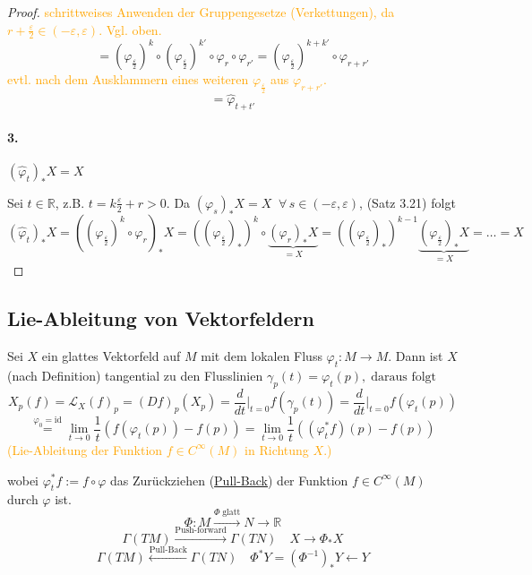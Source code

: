 \documentclass[fleqn, 12pt, letterpaper]{article}
\newcommand{\txt}[1]{\text{#1}}
\begin{document}
\begin{proof}
\hspace{2em} \textcolor{orange}{schrittweises Anwenden der Gruppengesetze (Verkettungen), da $r + \frac{\varepsilon}{2} \in (-\varepsilon, \varepsilon)$. Vgl. oben.}
\[
= \left(\varphi_{\frac{\varepsilon}{2}}\right)^k \circ \left(\varphi_{\frac{\varepsilon}{2}}\right)^{k'} \circ \varphi_r \circ \varphi_{r'}= \left(\varphi_{\frac{\varepsilon}{2}}\right)^{k + k'} \circ \varphi_{r + r'}
\]
\hspace{2em} \textcolor{orange}{evtl. nach dem Ausklammern eines weiteren $\varphi_{\frac{\varepsilon}{2}}$ aus $\varphi_{r+r'}$.}
\[= \hat{\varphi}_{t + t'}
\]
\paragraph{3.} $(\hat{\varphi}_t)_\ast X = X$

Sei $t \in \mathbb{R}$, z.B. $t = k \frac{\varepsilon}{2} + r > 0$. Da
\((\varphi_s)_\ast X = X \;\; \forall \, s \in (-\varepsilon, \varepsilon)\), (Satz 3.21)
folgt
\[
(\hat{\varphi}_t)_\ast X = \left((\varphi_{\frac{\varepsilon}{2}})^k \circ \varphi_r \right)_\ast X = \left((\varphi_{\frac{\varepsilon}{2}})_\ast\right)^k \circ \underbrace{(\varphi_r)_\ast X}_{= X} = \left((\varphi_{\frac{\varepsilon}{2}})_\ast\right)^{k-1} \underbrace{(\varphi_{\frac{\varepsilon}{2}})_\ast X}_{=X}=\dots=X
\]
\end{proof}


\subsection{Lie-Ableitung von Vektorfeldern}

Sei $X$ ein glattes Vektorfeld auf $M$ mit dem lokalen Fluss $\varphi_t: M \rightarrow M$.
Dann ist $X$ (nach Definition) tangential zu den Flusslinien 
\(\gamma_p(t) = \varphi_t(p),\; \text{daraus folgt}\)
\[
X_p(f)=\mathcal{L}_X (f)_p = (Df)_p(X_p) = \frac{d}{dt} \big|_{t=0} f(\gamma_p(t)) = \frac{d}{dt} \big|_{t=0} f(\varphi_t(p))
\]
\[
\overset{\varphi_0=\mathrm{id}}{=} \lim_{t \to 0} \frac{1}{t} \left(f(\varphi_t(p)) - f(p)\right) = \lim_{t \to 0} \frac{1}{t} \left((\varphi_t^* f)(p) - f(p)\right)
\]
\textcolor{orange}{(Lie-Ableitung der Funktion $f \in C^\infty(M)$ in Richtung $X$.)}

\vspace{1em}

wobei $\varphi_t^\ast f:= f\circ\varphi $ das Zurückziehen (\underline{Pull-Back}) der Funktion $f \in C^\infty(M)$ durch $\varphi$ ist.
\[
\Phi: M \overset{\Phi\;\txt{glatt}}{\rightarrow} N \rightarrow \mathbb{R}
\]
\[
\Gamma(TM) \overset{\txt{Push-forward}}{\rightarrow} \Gamma(TN) \quad X\rightarrow\Phi_*X
\]
\[
\Gamma(TM) \overset{\txt{Pull-Back}}{\leftarrow} \Gamma(TN) \quad \Phi^*Y=(\Phi^{-1})_*Y \leftarrow Y
\]
\end{document}
